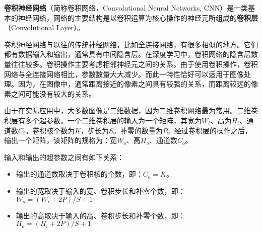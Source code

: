 
\textbf{卷积神经网络}（简称卷积网络，Convolutional Neural Networks, CNN）是一类基本的神经网络，网络的主要结构是以卷积运算为核心操作的神经元所组成的\textbf{卷积层}（Convolutional Layer）。

卷积神经网络与以往的传统神经网络，比如全连接网络，有很多相似的地方。它们都有数据输入和输出，通常具有中间隐含层。在深度学习中，卷积网络的隐含层数量往往较多。卷积操作主要考虑相邻神经元之间的关系。由于使用卷积操作，卷积网络与全连接网络相比，参数数量大大减少。而此一特性恰好可以适用于图像处理。因为，在图像中，通常距离接近的像素之间具有较强的关系，而距离较远的像素之间可能没有较大的关系。

由于在实际应用中，大多数图像是二维数据，因为二维卷积网络最为常用。二维卷积层有多个超参数。一个二维卷积层的输入为一个矩阵，其宽为$W_i$、高为$H_i$、通道数$C_i$。卷积核个数为$K$，步长为$S$。补零的数量为$P$。经过卷积层的操作之后，输出一个矩阵，该矩阵的规格为：宽$W_o$、高$H_o$、通道数$C_o$。

输入和输出的超参数之间有如下关系： \\
\begin{itemize}
\item 输出的通道数取决于卷积核的个数，即：$C_o=K$。
\item 输出的宽取决于输入的宽、卷积步长和补零个数，即：$W_o=(W_i+2P)/S+1$
\item 输出的高取决于输入的高、卷积步长和补零个数，即：$H_o=(H_i+2P)/S+1$
\end{itemize}